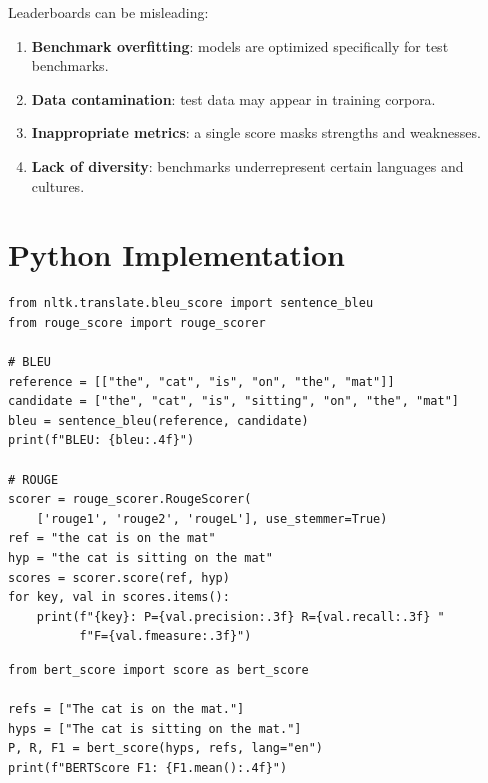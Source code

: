 \begin{attention}[title=\textbf{Leaderboard Pitfalls}]
Leaderboards can be misleading:
\begin{enumerate}
    \item \textbf{Benchmark overfitting}: models are optimized
    specifically for test benchmarks.
    \item \textbf{Data contamination}: test data may appear in training
    corpora.
    \item \textbf{Inappropriate metrics}: a single score masks strengths
    and weaknesses.
    \item \textbf{Lack of diversity}: benchmarks underrepresent certain
    languages and cultures.
\end{enumerate}
\end{attention}

\section{Python Implementation}
\label{sec:eval:code}

\begin{codeblock}[title=\textbf{Computing BLEU and ROUGE}]
\begin{verbatim}
from nltk.translate.bleu_score import sentence_bleu
from rouge_score import rouge_scorer

# BLEU
reference = [["the", "cat", "is", "on", "the", "mat"]]
candidate = ["the", "cat", "is", "sitting", "on", "the", "mat"]
bleu = sentence_bleu(reference, candidate)
print(f"BLEU: {bleu:.4f}")

# ROUGE
scorer = rouge_scorer.RougeScorer(
    ['rouge1', 'rouge2', 'rougeL'], use_stemmer=True)
ref = "the cat is on the mat"
hyp = "the cat is sitting on the mat"
scores = scorer.score(ref, hyp)
for key, val in scores.items():
    print(f"{key}: P={val.precision:.3f} R={val.recall:.3f} "
          f"F={val.fmeasure:.3f}")
\end{verbatim}
\end{codeblock}

\begin{codeblock}[title=\textbf{BERTScore}]
\begin{verbatim}
from bert_score import score as bert_score

refs = ["The cat is on the mat."]
hyps = ["The cat is sitting on the mat."]
P, R, F1 = bert_score(hyps, refs, lang="en")
print(f"BERTScore F1: {F1.mean():.4f}")
\end{verbatim}
\end{codeblock}

